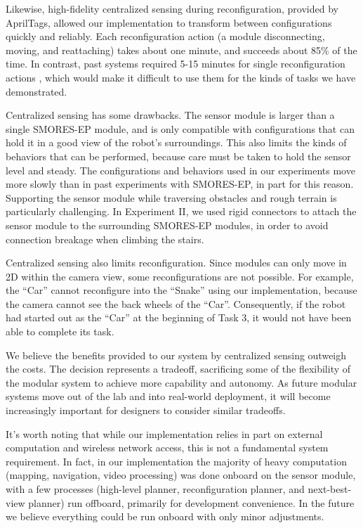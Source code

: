 \documentclass[journal]{IEEEtran}
\begin{document}
Likewise, high-fidelity centralized sensing during reconfiguration, provided by AprilTags, allowed our implementation to transform between configurations quickly and reliably.  Each reconfiguration action (a module disconnecting, moving, and reattaching) takes about one minute, and succeeds about 85\% of the time.  In contrast, past systems required 5-15 minutes for single reconfiguration actions \cite{Yim2007, Rubenstein2004,Murata2006}, which would make it difficult to use them for the kinds of tasks we have demonstrated.

Centralized sensing has some drawbacks.  The sensor module is larger than a single SMORES-EP module, and is only compatible with configurations that can hold it in a good view of the robot's surroundings.  This also limits the kinds of behaviors that can be performed, because care must be taken to hold the sensor level and steady.  The configurations and behaviors used in our experiments move more slowly than in past experiments with SMORES-EP, in part for this reason. Supporting the sensor module while traversing obstacles and rough terrain is particularly challenging.  In Experiment II, we used rigid connectors to attach the sensor module to the surrounding SMORES-EP modules, in order to avoid connection breakage when climbing the stairs. 

Centralized sensing also limits reconfiguration. Since modules can only move in 2D within the camera view,  some reconfigurations are not possible.  For example,  the ``Car'' cannot reconfigure into the ``Snake'' using  our implementation, because the camera cannot see the back wheels of the ``Car''. Consequently, if the robot had started out as the ``Car'' at the beginning of Task 3, it would not have been able to complete its task.

We believe the benefits provided to our system by centralized sensing outweigh the costs.  The decision represents a tradeoff, sacrificing some of the flexibility of the modular system to achieve more capability and autonomy.  As future modular systems move out of the lab and into real-world deployment, it will become increasingly important for designers to consider similar tradeoffs.

It's worth noting that while our implementation relies in part on external computation and wireless network access, this is not a fundamental system requirement.   In fact,  in our implementation the majority of  heavy computation (mapping, navigation, video processing) was done onboard on the sensor module, with a few processes (high-level planner, reconfiguration planner, and next-best-view planner) run offboard, primarily for development convenience. %
In the future we believe everything could be run onboard with only minor adjustments.
%
\end{document}
